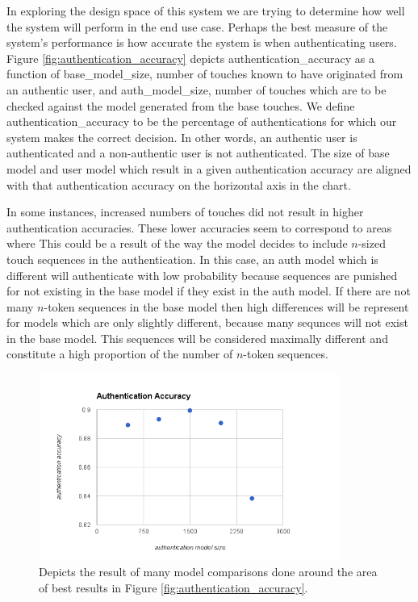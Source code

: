 \documentclass{acm_proc_article-sp}
\begin{document}
%
In exploring the design space of this system we are trying to determine how well the system will perform in the end use case. Perhaps the best measure of the system's performance is how accurate the system is when authenticating users. Figure \ref{fig:authentication_accuracy} depicts authentication\_accuracy as a function of base\_model\_size, number of touches known to have originated from an authentic user, and auth\_model\_size, number of touches which are to be checked against the model generated from the base touches. We define authentication\_accuracy to be the percentage of authentications for which our system makes the correct decision. In other words, an authentic user is authenticated and a non-authentic user is not authenticated. The size of base model and user model which result in a given authentication accuracy are aligned with that authentication accuracy on the horizontal axis in the chart. 

In some instances, increased numbers of touches did not result in higher authentication accuracies. 
These lower accuracies seem to correspond to areas where %
 This could be a result of the way the model decides to include $n$-sized touch sequences in the authentication. 
In this case, an auth model which is  different will authenticate with low probability because sequences are punished for not existing in the base model if they exist in the auth model.
If there are not many $n$-token sequences in the base model then high differences will be represent for models which are only slightly different, because many sequnces will not exist in the base model.
This sequences will be considered maximally different and constitute a high proportion of the number of $n$-token sequences.

\begin{figure}
\centering
\includegraphics[width=3.9in]{extensive_authentication_accuracy.png}
\caption{Depicts the result of many model comparisons done around the area of best results in Figure \ref{fig:authentication_accuracy}.}
\label{fig:extensive_authentication_accuracy}
\end{figure}
\end{document}
